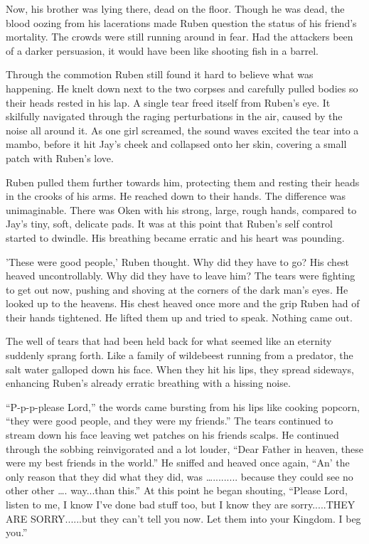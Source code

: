 Now, his brother was lying there, dead on the floor.  Though he was dead, the blood oozing from his lacerations made Ruben question the status of his friend's mortality.  The crowds were still running around in fear.  Had the attackers been of a darker persuasion, it would have been like shooting fish in a barrel.

Through the commotion Ruben still found it hard to believe what was happening.  He knelt down next to the two corpses and carefully pulled bodies so their heads rested in his lap.  A single tear freed itself from Ruben's eye.  It skilfully navigated through the raging perturbations in the air, caused by the noise all around it.  As one girl screamed, the sound waves excited the tear into a mambo, before it hit Jay's cheek and collapsed onto her skin, covering a small patch with Ruben's love.

Ruben pulled them further towards him, protecting them and resting their heads in the crooks of his arms.  He reached down to their hands.  The difference was unimaginable.  There was Oken with his strong, large, rough hands, compared to Jay's tiny, soft, delicate pads.  It was at this point that Ruben's self control started to dwindle.  His breathing became erratic and his heart was pounding.

'These were good people,' Ruben thought.  Why did they have to go?  His chest heaved uncontrollably.  Why did they have to leave him?  The tears were fighting to get out now, pushing and shoving at the corners of the dark man's eyes.  He looked up to the heavens.  His chest heaved once more and the grip Ruben had of their hands tightened.  He lifted them up and tried to speak.  Nothing came out.

The well of tears that had been held back for what seemed like an eternity suddenly sprang forth.  Like a family of wildebeest running from a predator, the salt water galloped down his face.  When they hit his lips, they spread sideways, enhancing Ruben's already erratic breathing with a hissing noise.

``P-p-p-please Lord,'' the words came bursting from his lips like cooking popcorn, ``they were good people, and they were my friends.''  The tears continued to stream down his face leaving wet patches on his friends scalps.  He continued through the sobbing reinvigorated and a lot louder, ``Dear Father in heaven, these were my best friends in the world.''  He sniffed and heaved once again, ``An' the only reason that they did what they did, was …......... because they could see no other other …. way...than this.''  At this point he began shouting, ``Please Lord, listen to me, I know I've done bad stuff too, but I know they are sorry.....THEY ARE SORRY......but they can't tell you now.  Let them into your Kingdom.  I beg you.''

